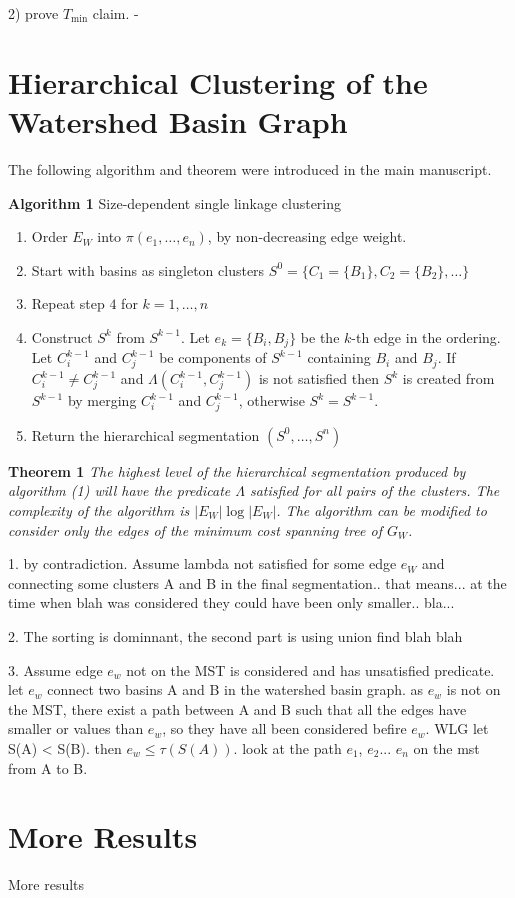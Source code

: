 \documentclass{llncs}
\begin{document}
2) prove $T_{\min}$ claim.
-

\section{Hierarchical Clustering of the Watershed Basin Graph}\label{sec:Others}

The following algorithm and theorem were introduced in the main manuscript.

\textbf{Algorithm 1 } Size-dependent single linkage clustering
\begin{enumerate}
\item Order $E_{W}$ into $\pi(e_{1},\dots,e_{n})$, by non-decreasing edge
weight.
\item Start with basins as singleton clusters $S^{0}=\{C_{1}=\{B_{1}\},C_{2}=\{B_{2}\},\dots\}$
\item Repeat step $4$ for $k=1,\dots,n$
\item Construct $S^{k}$ from $S^{k-1}$. Let $e_{k}=\{B_{i},B_{j}\}$ be
the $k$-th edge in the ordering. Let $C_{i}^{k-1}$ and $C_{j}^{k-1}$
be components of $S^{k-1}$ containing $B_{i}$ and $B_{j}$. If $C_{i}^{k-1}\neq C_{j}^{k-1}$
and $\Lambda(C_{i}^{k-1},C_{j}^{k-1})$ is not satisfied then $S^{k}$ is created from
$S^{k-1}$ by merging $C_{i}^{k-1}$ and $C_{j}^{k-1}$, otherwise
$S^{k}=S^{k-1}.$
\item Return the hierarchical segmentation $(S^{0},\dots,S^{n})$
\end{enumerate}
\textbf{Theorem 1 }\emph{The highest level of the hierarchical segmentation
produced by algorithm (1) will have the predicate $\Lambda$ satisfied
for all pairs of the clusters. The complexity of the algorithm is
$\left|E_{W}\right|\log\left|E_{W}\right|$. The algorithm can be
modified to consider only the edges of the minimum cost spanning tree
of $G_{W}$.}

1. by contradiction. Assume lambda not satisfied for some edge $e_W$ and connecting some clusters A and B in the final segmentation.. that means...
at the time when blah was considered they could have been only smaller.. bla...

2. The sorting is dominnant, the second part is using union find blah blah

3. Assume edge $e_w$ not on the MST is considered and has unsatisfied predicate. let $e_w$ connect two basins A and B in the watershed basin graph.
as $e_w$ is not on the MST, there exist a path between A and B such that all the edges have smaller or values than $e_w$, so they have all been considered
befire $e_w$. WLG let S(A) < S(B). then $e_w \le \tau(S(A))$. look at the path $e_1$, $e_2$... $e_n$ on the mst from A to B.
\section{More Results}\label{sec:Conclusion}

More results
\end{document}
